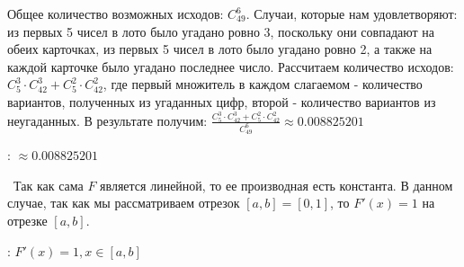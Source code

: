 \noindent Общее количество возможных исходов: $C_{49}^6$. Случаи, которые нам удовлетворяют: 
из первых 5 чисел в лото было угадано ровно 3, поскольку они совпадают на обеих карточках, из 
первых 5 чисел в лото было угадано ровно 2, а также на каждой карточке было угадано последнее число.
Рассчитаем количество исходов: $C_5^3 \cdot  C_{42}^3 + C_5^2 \cdot C_{42}^2$, где первый множитель
в каждом слагаемом - количество вариантов, полученных из угаданных цифр, второй - количество вариантов
из неугаданных. В результате получим: $\frac{C_5^3 \cdot  C_{42}^3 + C_5^2 \cdot C_{42}^2}{C_{49}^6} \approx 
0.008825201$

\bigskip
{}: $ \approx 0.008825201$


\noindent~Так как сама $F$ является линейной, то ее производная есть константа. В данном случае, 
так как мы рассматриваем отрезок $\left[a, b\right] = \left[0, 1\right] $, то $F'(x) = 1$ на отрезке 
$\left[a, b\right] $.

\bigskip
{}: $F'(x) = 1, x \in \left[a, b\right]$
